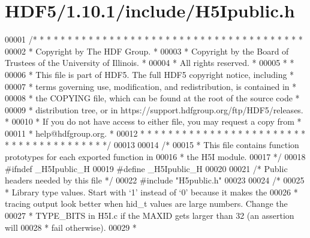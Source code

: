 \hypertarget{_h_d_f5_21_810_81_2include_2_h5_ipublic_8h_source}{}\section{H\+D\+F5/1.10.1/include/\+H5\+Ipublic.h}
\label{_h_d_f5_21_810_81_2include_2_h5_ipublic_8h_source}

\begin{DoxyCode}
00001 \textcolor{comment}{/* * * * * * * * * * * * * * * * * * * * * * * * * * * * * * * * * * * * * * *}
00002 \textcolor{comment}{ * Copyright by The HDF Group.                                               *}
00003 \textcolor{comment}{ * Copyright by the Board of Trustees of the University of Illinois.         *}
00004 \textcolor{comment}{ * All rights reserved.                                                      *}
00005 \textcolor{comment}{ *                                                                           *}
00006 \textcolor{comment}{ * This file is part of HDF5.  The full HDF5 copyright notice, including     *}
00007 \textcolor{comment}{ * terms governing use, modification, and redistribution, is contained in    *}
00008 \textcolor{comment}{ * the COPYING file, which can be found at the root of the source code       *}
00009 \textcolor{comment}{ * distribution tree, or in https://support.hdfgroup.org/ftp/HDF5/releases.  *}
00010 \textcolor{comment}{ * If you do not have access to either file, you may request a copy from     *}
00011 \textcolor{comment}{ * help@hdfgroup.org.                                                        *}
00012 \textcolor{comment}{ * * * * * * * * * * * * * * * * * * * * * * * * * * * * * * * * * * * * * * */}
00013 
00014 \textcolor{comment}{/*}
00015 \textcolor{comment}{ * This file contains function prototypes for each exported function in}
00016 \textcolor{comment}{ * the H5I module.}
00017 \textcolor{comment}{ */}
00018 \textcolor{preprocessor}{#ifndef \_H5Ipublic\_H}
00019 \textcolor{preprocessor}{#define \_H5Ipublic\_H}
00020 
00021 \textcolor{comment}{/* Public headers needed by this file */}
00022 \textcolor{preprocessor}{#include "H5public.h"}
00023 
00024 \textcolor{comment}{/*}
00025 \textcolor{comment}{ * Library type values.  Start with `1' instead of `0' because it makes the}
00026 \textcolor{comment}{ * tracing output look better when hid\_t values are large numbers.  Change the}
00027 \textcolor{comment}{ * TYPE\_BITS in H5I.c if the MAXID gets larger than 32 (an assertion will}
00028 \textcolor{comment}{ * fail otherwise).}
00029 \textcolor{comment}{ *}

\end{DoxyCode}
